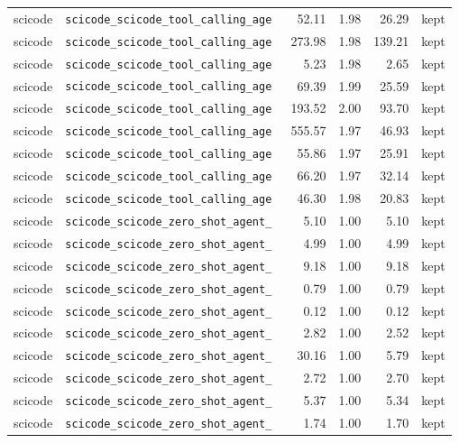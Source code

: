{\begin{longtable}{llrrrl}
scicode & \texttt{\scriptsize scicode\_scicode\_tool\_calling\_age~} & 52.11 & 1.98 & 26.29 & kept \\
scicode & \texttt{\scriptsize scicode\_scicode\_tool\_calling\_age~} & 273.98 & 1.98 & 139.21 & kept \\
scicode & \texttt{\scriptsize scicode\_scicode\_tool\_calling\_age~} & 5.23 & 1.98 & 2.65 & kept \\
scicode & \texttt{\scriptsize scicode\_scicode\_tool\_calling\_age~} & 69.39 & 1.99 & 25.59 & kept \\
scicode & \texttt{\scriptsize scicode\_scicode\_tool\_calling\_age~} & 193.52 & 2.00 & 93.70 & kept \\
scicode & \texttt{\scriptsize scicode\_scicode\_tool\_calling\_age~} & 555.57 & 1.97 & 46.93 & kept \\
scicode & \texttt{\scriptsize scicode\_scicode\_tool\_calling\_age~} & 55.86 & 1.97 & 25.91 & kept \\
scicode & \texttt{\scriptsize scicode\_scicode\_tool\_calling\_age~} & 66.20 & 1.97 & 32.14 & kept \\
scicode & \texttt{\scriptsize scicode\_scicode\_tool\_calling\_age~} & 46.30 & 1.98 & 20.83 & kept \\
scicode & \texttt{\scriptsize scicode\_scicode\_zero\_shot\_agent\_~} & 5.10 & 1.00 & 5.10 & kept \\
scicode & \texttt{\scriptsize scicode\_scicode\_zero\_shot\_agent\_~} & 4.99 & 1.00 & 4.99 & kept \\
scicode & \texttt{\scriptsize scicode\_scicode\_zero\_shot\_agent\_~} & 9.18 & 1.00 & 9.18 & kept \\
scicode & \texttt{\scriptsize scicode\_scicode\_zero\_shot\_agent\_~} & 0.79 & 1.00 & 0.79 & kept \\
scicode & \texttt{\scriptsize scicode\_scicode\_zero\_shot\_agent\_~} & 0.12 & 1.00 & 0.12 & kept \\
scicode & \texttt{\scriptsize scicode\_scicode\_zero\_shot\_agent\_~} & 2.82 & 1.00 & 2.52 & kept \\
scicode & \texttt{\scriptsize scicode\_scicode\_zero\_shot\_agent\_~} & 30.16 & 1.00 & 5.79 & kept \\
scicode & \texttt{\scriptsize scicode\_scicode\_zero\_shot\_agent\_~} & 2.72 & 1.00 & 2.70 & kept \\
scicode & \texttt{\scriptsize scicode\_scicode\_zero\_shot\_agent\_~} & 5.37 & 1.00 & 5.34 & kept \\
scicode & \texttt{\scriptsize scicode\_scicode\_zero\_shot\_agent\_~} & 1.74 & 1.00 & 1.70 & kept \\

\end{longtable}}
